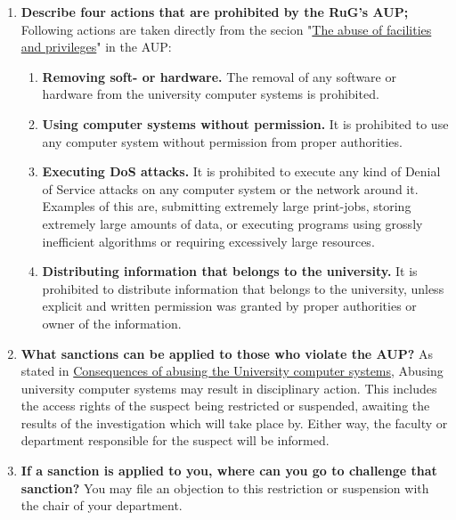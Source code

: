 \documentclass{report}
\begin{document}
\begin{enumerate}
      \item \textbf{Describe four actions that are prohibited by the RuG's AUP;}
            Following actions are taken directly from the secion 
            "\href{
                  https://www.rug.nl/society-business/centre-for-information-technology/security/aup/#:~:text=The%
            }{The abuse of facilities and privileges}"
            in the AUP:
            \begin{enumerate}
                  \item \textbf{Removing soft- or hardware.}
                        The removal of any software or hardware from the university computer systems is prohibited.
                  \item \textbf{Using computer systems without permission.}
                        It is prohibited to use any computer system without permission from proper authorities.
                  \item \textbf{Executing DoS attacks.}
                        It is prohibited to execute any kind of Denial of Service attacks on any computer system
                        or the network around it. Examples of this are, submitting extremely large print-jobs,
                        storing extremely large amounts of data, or executing programs using grossly inefficient algorithms
                        or requiring excessively large resources.
                  \item \textbf{Distributing information that belongs to the university.}
                        It is prohibited to distribute information that belongs to the university,
                        unless explicit and written permission was granted by proper authorities or owner of the information.
            \end{enumerate}

      \item \textbf{What sanctions can be applied to those who violate the AUP?}
            As stated in
            \href{
                  https://www.rug.nl/society-business/centre-for-information-technology/security/aup/#:~:text=Consequences%
            }{Consequences of abusing the University computer systems},
            Abusing university computer systems may result in disciplinary action.
            This includes the access rights of the suspect being restricted or suspended,
            awaiting the results of the investigation which will take place by. Either way,
            the faculty or department responsible for the suspect will be informed.

      \item \textbf{If a sanction is applied to you, where can you go to challenge that sanction?}
            You may file an objection to this restriction or suspension with the chair of your department.

\end{enumerate}
\end{document}
